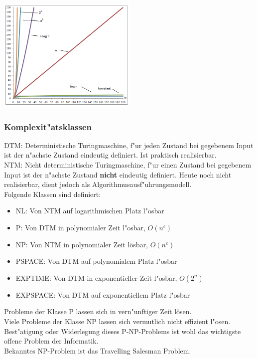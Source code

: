 \begin{center}
{\includegraphics[width=0.5\textwidth]{images/Algorithmen/Wachstumsfunktionen.png}}
\label{Fig: Verschiedene Wachstumsfunktionen}
\end{center}

\subsubsection{Komplexit"atsklassen}
DTM: Deterministische Turingmaschine, f"ur jeden Zustand bei gegebenem Input ist der n"achste Zustand eindeutig definiert. Ist praktisch realisierbar. \\
NTM: Nicht deterministische Turingmaschine, f"ur einen Zustand bei gegebenem Input ist der n"achste Zustand \textbf{nicht} eindeutig definiert. Heute noch nicht realisierbar, dient jedoch als Algorithmusausf"uhrungsmodell.\\
Folgende Klassen sind definiert:\\
\begin{itemize}
\item NL:       Von NTM auf logarithmischen Platz l"osbar 
\item P:        Von DTM in polynomialer Zeit l"osbar, $O(n^c)$
\item NP:       Von NTM in polynomialer Zeit lösbar, $O(n^c)$
\item PSPACE:   Von DTM auf polynomialem Platz l"osbar
\item EXPTIME:  Von DTM in exponentieller Zeit l"osbar, $O(2^n)$
\item EXPSPACE: Von DTM auf exponentiellem Platz l"osbar
\end{itemize}

Probleme der Klasse P lassen sich in vern"unftiger Zeit lösen. \\
Viele Probleme der Klasse NP lassen sich vermutlich nicht effizient l"osen.\\
Best"atigung oder Widerlegung dieses P-NP-Problems ist wohl das wichtigste offene Problem der Informatik.\\
Bekanntes NP-Problem ist das Travelling Salesman Problem.\\

